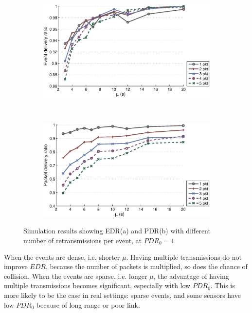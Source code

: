 \begin{figure}[p]
    \centering
    \begin{subfigure}[t]{0.7\textwidth}
        \centering
        \includegraphics[width=\textwidth] {../../sw/pc/matlab/simulation-result/retrans-count-edr-20min-pdr1.eps}
        \caption{}
    \end{subfigure} 
    \\
    \begin{subfigure}[t]{0.7\textwidth}
        \centering
        \includegraphics[width=\textwidth] {../../sw/pc/matlab/simulation-result/retrans-count-pdr-20min-pdr1.eps}
        \caption{}
    \end{subfigure}
    \caption[EDR and PDR with different transmission redundancy, $PDR_0 = 1$]{Simulation results showing EDR(a) and PDR(b) with different number of retransmissions per event, at $PDR_0 = 1$}\label{fig:retrans-lambda-1}
\end{figure}

When the events are dense, i.e. shorter $\mu$. Having multiple transmissions do not improve $EDR$, because the number of packets is multiplied, so does the chance of collision. When the events are sparse, i.e. longer $\mu$, the advantage of having multiple transmissions becomes significant, especially with low $PDR_0$. This is more likely to be the case in real settings: sparse events, and some sensors have low $PDR_0$ because of long range or poor link. 

